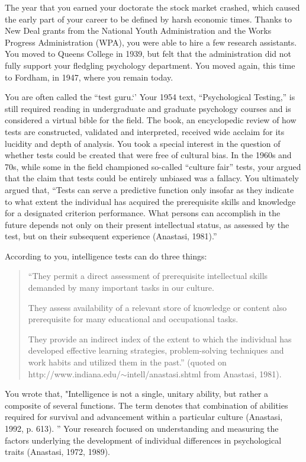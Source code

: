 \begin{refsection}
The year that you earned your doctorate the stock market crashed, which caused the early part of your career to be defined by harsh economic times. Thanks to New Deal grants from the National Youth Administration and the Works Progress Administration (WPA), you were able to hire a few research assistants. You moved to Queens College in 1939, but felt that the administration did not fully support your fledgling psychology department. You moved again, this time to Fordham, in 1947, where you remain today.

You are often called the “test guru.`' Your 1954 text, ``Psychological Testing,'' is still required reading in undergraduate and graduate psychology courses and is considered a virtual bible for the field. The book, an encyclopedic review of how tests are constructed, validated and interpreted, received wide acclaim for its lucidity and depth of analysis. You took a special interest in the question of whether tests could be created that were free of cultural bias. In the 1960s and 70s, while some in the field championed so-called ``culture fair'' tests, your argued that the claim that tests could be entirely unbiased was a fallacy. You ultimately argued that, “Tests can serve a predictive function only insofar as they indicate to what extent the individual has acquired the prerequisite skills and knowledge for a designated criterion performance. What persons can accomplish in the future depends not only on their present intellectual status, as assessed by the test, but on their subsequent experience (Anastasi, 1981).”

According to you, intelligence tests can do three things:

\begin{quote}

“They permit a direct assessment of prerequisite intellectual skills demanded by many important tasks in our culture.

They assess availability of a relevant store of knowledge or content also prerequisite for many educational and occupational tasks.

They provide an indirect index of the extent to which the individual has developed effective learning strategies, problem-solving techniques and work habits and utilized them in the past.” (quoted on http:\slash \slash www.indiana.edu\slash \ensuremath{\sim}intell\slash anastasi.shtml from Anastasi, 1981).
\end{quote}

You wrote that, "Intelligence is not a single, unitary ability, but rather a composite of several functions. The term denotes that combination of abilities required for survival and advancement within a particular culture (Anastasi, 1992, p. 613). ” Your research focused on understanding and measuring the factors underlying the development of individual differences in psychological traits (Anastasi, 1972, 1989). 


\end{refsection}
